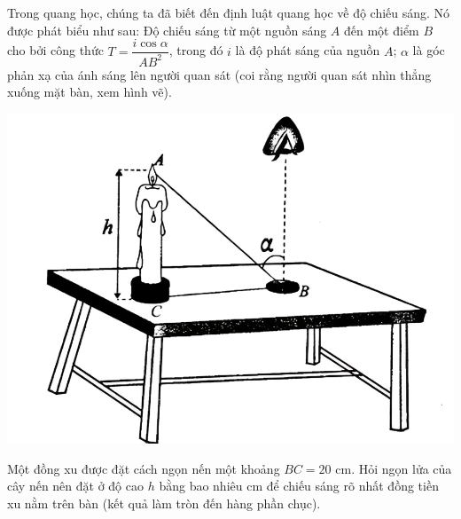 \begin{ex}%
Trong quang học, chúng ta đã biết đến định luật quang học về độ chiếu sáng. Nó được phát biểu như sau: Độ chiếu sáng từ một nguồn sáng $A$ đến một điểm $B$ cho bởi công thức $T=\dfrac{i\cos\alpha}{AB^2}$, trong đó $i$ là độ phát sáng của nguồn $A$; $\alpha$ là góc phản xạ của ánh sáng lên người quan sát (coi rằng người quan sát nhìn thẳng xuống mặt bàn, xem hình vẽ).
\begin{center}
\includegraphics[scale=0.18]{images/de15-2}
\end{center}
Một đồng xu được đặt cách ngọn nến một khoảng $BC=20$ cm. Hỏi ngọn lửa của cây nến nên đặt ở độ cao $h$ bằng bao nhiêu cm để chiếu sáng rõ nhất đồng tiền xu nằm trên bàn (kết quả làm tròn đến hàng phần chục).
\end{ex}
